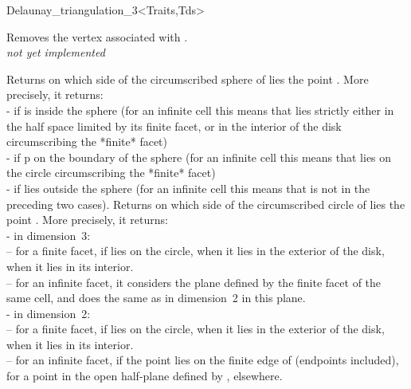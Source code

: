\begin{ccClassTemplate}{Delaunay_triangulation_3<Traits,Tds>}

{Removes the vertex associated with .
\\
\textit{not yet implemented}}


{Returns on which side of the circumscribed sphere of  lies 
the point . More precisely, it returns:\\
-  if  is inside the sphere (for an infinite
cell this means that  lies strictly either in the half space
limited by its finite facet, or in the interior of the disk
circumscribing the *finite* facet) \\ 
-  if p on the boundary of the sphere (for an infinite
cell this means that  lies on the circle circumscribing
the *finite* facet)\\ 
-  if  lies outside the sphere (for an
infinite cell this means that  is not in the preceding two
cases).
}
{Returns on which side of the circumscribed circle of  lies 
the point . More precisely, it returns:\\
- in dimension~3:\\
-- for a finite facet,  if  lies
on the circle,  when it lies in the exterior of
the disk,  when it lies in its interior.\\
-- for an infinite facet, it considers the plane defined by the finite
facet of the same cell, and does the same as in dimension~2 in this
plane.\\
- in dimension~2:\\
-- for a finite facet,  if  lies
on the circle,  when it lies in the exterior of
the disk,  when it lies in its interior.\\
-- for an infinite facet,  if the
point lies on the finite edge of  (endpoints included),
 for a point in the open half-plane defined
by ,  elsewhere.
}


\end{ccClassTemplate}
